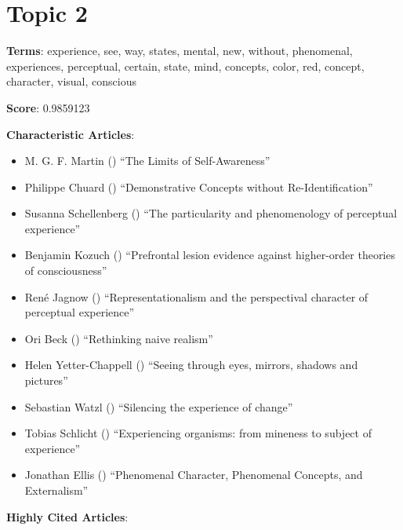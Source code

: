 \documentclass[
  10pt,
  letterpaper,
  DIV=11,
  numbers=noendperiod,
  twoside]{scrartcl}
\providecommand{\tightlist}{%
  \setlength{\itemsep}{0pt}\setlength{\parskip}{0pt}}\usepackage{longtable,booktabs,array}
\begin{document}
\section{Topic 2}\label{topic-2}

\textbf{Terms}: experience, see, way, states, mental, new, without,
phenomenal, experiences, perceptual, certain, state, mind, concepts,
color, red, concept, character, visual, conscious

\textbf{Score}: 0.9859123

\textbf{Characteristic Articles}:

\begin{itemize}
\tightlist
\item
  M. G. F. Martin () ``The Limits
  of Self-Awareness''
\item
  Philippe Chuard ()
  ``Demonstrative Concepts without Re-Identification''
\item
  Susanna Schellenberg () ``The
  particularity and phenomenology of perceptual experience''
\item
  Benjamin Kozuch () ``Prefrontal
  lesion evidence against higher-order theories of consciousness''
\item
  René Jagnow ()
  ``Representationalism and the perspectival character of perceptual
  experience''
\item
  Ori Beck () ``Rethinking naive
  realism''
\item
  Helen Yetter-Chappell ()
  ``Seeing through eyes, mirrors, shadows and pictures''
\item
  Sebastian Watzl () ``Silencing
  the experience of change''
\item
  Tobias Schlicht ()
  ``Experiencing organisms: from mineness to subject of experience''
\item
  Jonathan Ellis () ``Phenomenal
  Character, Phenomenal Concepts, and Externalism''
\end{itemize}

\textbf{Highly Cited Articles}:
\end{document}
